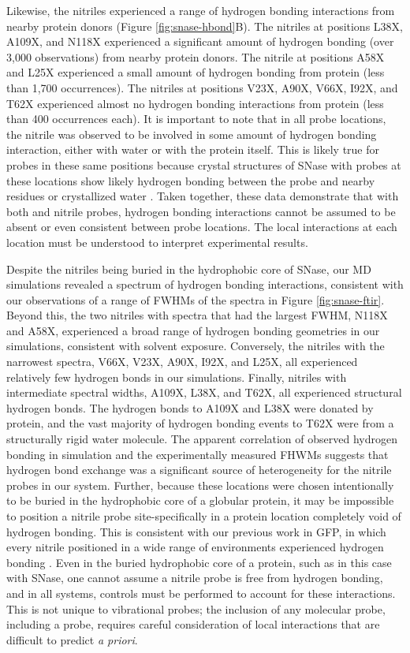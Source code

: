 Likewise, the nitriles experienced a range of hydrogen bonding interactions from nearby protein donors (Figure \ref{fig:snase-hbond}B). 
The nitriles at positions L38X, A109X, and N118X experienced a significant amount of hydrogen bonding (over 3,000 observations) from nearby protein donors. 
The nitrile at positions A58X and L25X experienced a small amount of hydrogen bonding from protein (less than 1,700 occurrences). 
The nitriles at positions V23X, A90X, V66X, I92X, and T62X experienced almost no hydrogen bonding interactions from protein (less than 400 occurrences each). 
It is important to note that in all probe locations, the nitrile was observed to be involved in some amount of hydrogen bonding interaction, either with water or with the protein itself. 
This is likely true for \pKa{} probes in these same positions because crystal structures of SNase with \pKa{} probes at these locations show likely hydrogen bonding between the probe and nearby residues or crystallized water \cite{Robinson2018}. 
Taken together, these data demonstrate that with both \pKa{} and nitrile probes, hydrogen bonding interactions cannot be assumed to be absent or even consistent between probe locations. 
The local interactions at each location must be understood to interpret experimental results.

Despite the nitriles being buried in the hydrophobic core of SNase, our MD simulations revealed a spectrum of hydrogen bonding interactions, consistent with our observations of a range of FWHMs of the spectra in Figure \ref{fig:snase-ftir}. 
Beyond this, the two nitriles with spectra that had the largest FWHM, N118X and A58X, experienced a broad range of hydrogen bonding geometries in our simulations, consistent with solvent exposure. 
Conversely, the nitriles with the narrowest spectra, V66X, V23X, A90X, I92X, and L25X, all experienced relatively few hydrogen bonds in our simulations. 
Finally, nitriles with intermediate spectral widths, A109X, L38X, and T62X, all experienced structural hydrogen bonds. 
The hydrogen bonds to A109X and L38X were donated by protein, and the vast majority of hydrogen bonding events to T62X were from a structurally rigid water molecule. 
The apparent correlation of observed hydrogen bonding in simulation and the experimentally measured FHWMs suggests that hydrogen bond exchange was a significant source of heterogeneity for the nitrile probes in our system. 
Further, because these locations were chosen intentionally to be buried in the hydrophobic core of a globular protein, it may be impossible to position a nitrile probe site-specifically in a protein location completely void of hydrogen bonding. 
This is consistent with our previous work in GFP, in which every nitrile positioned in a wide range of environments experienced hydrogen bonding \cite{First2018}. 
Even in the buried hydrophobic core of a protein, such as in this case with SNase, one cannot assume a nitrile probe is free from hydrogen bonding, and in all systems, controls must be performed to account for these interactions. 
This is not unique to vibrational probes; 
the inclusion of any molecular probe, including a \pKa{} probe, requires careful consideration of local interactions that are difficult to predict \emph{a priori}. 

